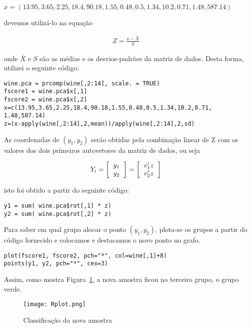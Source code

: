 \documentclass[11pt,a4paper]{book}
\begin{document}
\begin{enumerate}
\begin{itemize}
				 $x=(13.95, 3.65, 2.25, 18.4, 90.18, 1.55, 0.48, 0.5, 1.34, 10.2, 0.71, 1.48, 587.14)$
				 
				 devemos utilizá-lo na equação
				 
				 \begin{eqnarray*}
				 	Z= \frac{x-\bar{X}}{S}
				 \end{eqnarray*}
				 
				 onde $\bar{X}$ e $S$ são as médias e os desvios-padrões da matriz de dados.
				 Desta forma, utilizei o seguinte código:
				 
				 \begin{lstlisting}
wine.pca = prcomp(wine[,2:14], scale. = TRUE)
fscore1 = wine.pca$x[,1]
fscore2 = wine.pca$x[,2]
x=c(13.95,3.65,2.25,18.4,90.18,1.55,0.48,0.5,1.34,10.2,0.71,
1.48,587.14)
z=(x-apply(wine[,2:14],2,mean))/apply(wine[,2:14],2,sd)
				 \end{lstlisting} 
				 
				 As coordenadas de $(y_1,y_2)$ serão obtidas pela combinação linear de Z com os valores dos dois primeiros autovetores da matriz de dados, ou seja
				 
				 \begin{eqnarray*}
				 	Y_i=\left[
				 	\begin{tabular}{c}
				 	$y_1$\\
				 	$y_2$
				 	\end{tabular}
				 	\right]=\left[
				 	\begin{tabular}{c}
				 	$v_1'z$\\
				 	$v_2'z$
				 	\end{tabular}
				 	\right]
				 \end{eqnarray*}
				 
				 isto foi obtido a partir do seguinte código:
				 \begin{lstlisting}
y1 = sum( wine.pca$rot[,1] * z)
y2 = sum( wine.pca$rot[,2] * z)
				 \end{lstlisting}
				 
				 Para saber em qual grupo alocar o ponto $(y_1,y_2)$, plota-se os grupos a partir do código fornecido e colocamos e destacamos o novo ponto no grafo.
				 
				 \begin{lstlisting}
plot(fscore1, fscore2, pch="*", col=wine[,1]+8)
points(y1, y2, pch="*", cex=3)
				 \end{lstlisting}
				 
				 Assim, como mostra Figura~\ref{fig:fig1}, a nova amostra ficou no terceiro grupo, o grupo verde.
				 
				 \begin{figure}
				 \centering
				 \texttt{[image: Rplot.png]}
				 \caption{Classificação da nova amostra}
				 \label{fig:fig1}
				 \end{figure}
			 	\end{itemize}
	\end{enumerate}
\end{document}
